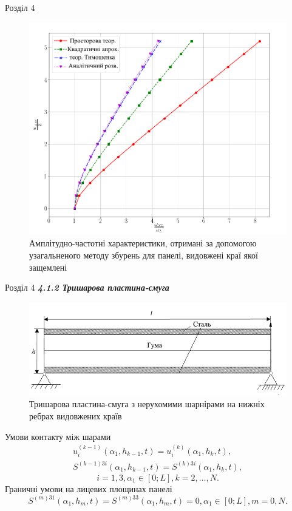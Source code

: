 \documentclass[8pt]{beamer}
\numberwithin{figure}{section}
\numberwithin{equation}{section}
\numberwithin{table}{section}
\begin{document}
\begin{frame}{Розділ 4}

\begin{figure}
	\includegraphics[scale=0.3]{pic/AFRC1ukr2.png}
		\caption{Амплітудно-частотні характеристики, отримані за допомогою узагальненого методу збурень для панелі, видовжені краї якої защемлені}
		\label{fig:AFR_C}
\end{figure}


\end{frame}

\begin{frame}{Розділ 4}
\textbf{\textit{4.1.2 Тришарова пластина-смуга}}

\begin{figure}
	\includegraphics[scale=0.4]{pic/plate3layers_ukr.png}
		\caption{Тришарова пластина-смуга з нерухомими шарнірами на нижніх ребрах видовжених країв}
\end{figure}

Умови контакту між шарами
\begin{gather}
u_i^{(k-1)}\left(\alpha_1, h_{k-1},t \right)=u_i^{(k)}\left(\alpha_1, h_{k},t \right),\\
S^{(k-1)3i}\left(\alpha_1, h_{k-1},t \right)=S^{(k)3i}\left(\alpha_1, h_{k},t \right),
\end{gather}
\[ i=1,3, \alpha_1 \in [0;L], k=2,\dots,N.\]
Граничні умови на лицевих площинах панелі
\begin{equation}
S^{(m)31}\left(\alpha_1, h_{m},t \right)=S^{(m)33}\left(\alpha_1, h_{m},t \right)=0,\alpha_1 \in [0;L], m=0,N.
\end{equation}

\end{frame}
\end{document}
